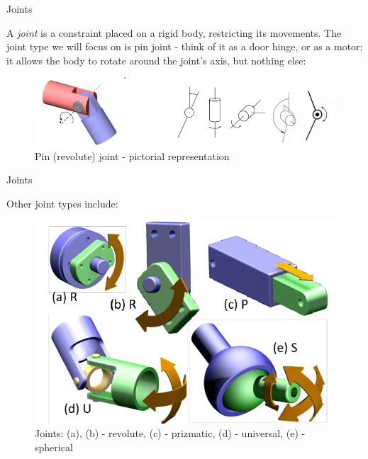 \documentclass{beamer}
\begin{document}
\begin{frame}{Joints}
	\begin{flushleft}
		
		A \emph{joint} is a constraint placed on a rigid body, restricting its movements. The joint type we will focus on is pin joint - think of it as a door hinge, or as a motor; it allows the body to rotate around the joint's axis, but nothing else:
		
	
		\begin{figure}
			\centering
			\includegraphics[width=0.7\linewidth]{PinJoints}
			\caption{Pin (revolute) joint - pictorial representation}
			\label{fig:pinjoints}
		\end{figure}
		
		
	\end{flushleft}
\end{frame}



\begin{frame}{Joints}
	\begin{flushleft}
		
		Other joint types include:

		\begin{figure}
			\centering
			\includegraphics[width=0.7\linewidth]{"Other joints"}
			\caption{Joints: (a), (b) - revolute, (c) - prizmatic, (d) - universal, (e) - spherical}
			\label{fig:other-joints}
		\end{figure}
		
		
	\end{flushleft}
\end{frame}
\end{document}
